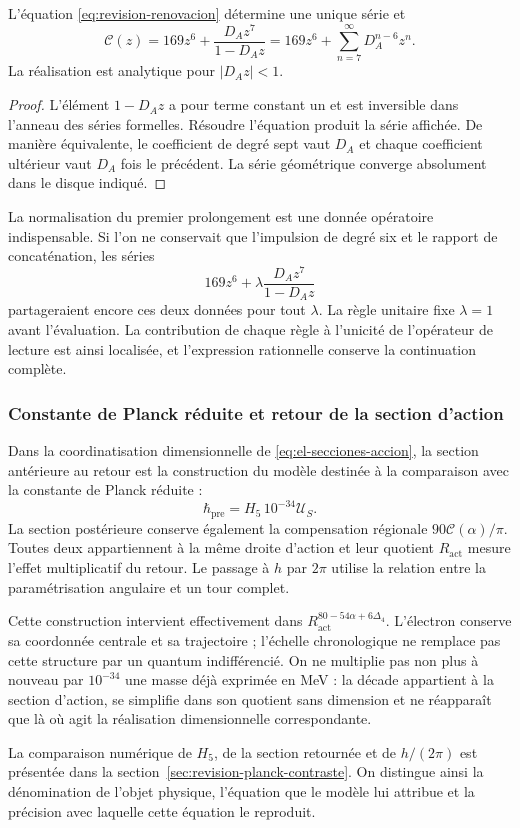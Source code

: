 \begin{proposition}
L'équation \eqref{eq:revision-renovacion} détermine une unique série et
\[
 \mathscr C(z)=169z^6+\frac{D_Az^7}{1-D_Az}
             =169z^6+\sum_{n=7}^{\infty}D_A^{n-6}z^n.
\]
La réalisation est analytique pour \(|D_Az|<1\).
\end{proposition}
\begin{proof}
L'élément \(1-D_Az\) a pour terme constant un et est inversible
dans l'anneau des séries formelles. Résoudre l'équation produit la série
affichée. De manière équivalente, le coefficient de degré sept vaut \(D_A\)
et chaque coefficient ultérieur vaut \(D_A\) fois le précédent. La série
géométrique converge absolument dans le disque indiqué.
\end{proof}

La normalisation du premier prolongement est une donnée opératoire
indispensable. Si l'on ne conservait que l'impulsion de degré six et
le rapport de concaténation, les séries
\[
 169z^6+\lambda\frac{D_Az^7}{1-D_Az}
\]
partageraient encore ces deux données pour tout \(\lambda\).
La règle unitaire fixe \(\lambda=1\) avant l'évaluation.
La contribution de chaque règle à l'unicité de l'opérateur de lecture
est ainsi localisée, et l'expression rationnelle conserve la continuation complète.

\subsubsection{Constante de Planck réduite et retour de la section d'action}

Dans la coordinatisation dimensionnelle de \eqref{eq:el-secciones-accion}, la section
antérieure au retour est la construction du modèle destinée à la comparaison
avec la constante de Planck réduite :
\[
 \hbar_{\mathrm{pre}}=H_5\,10^{-34}\mathcal U_S.
\]
La section postérieure conserve également la compensation régionale
\(90\mathscr C(\alpha)/\pi\). Toutes deux appartiennent à la même droite
d'action et leur quotient \(R_{\mathrm{act}}\) mesure l'effet multiplicatif
du retour. Le passage à \(h\) par \(2\pi\) utilise la relation
entre la paramétrisation angulaire et un tour complet.

Cette construction intervient effectivement dans
\(R_{\mathrm{act}}^{80-54\alpha+6\Delta_4}\). L'électron conserve
sa coordonnée centrale et sa trajectoire ; l'échelle chronologique ne
remplace pas cette structure par un quantum indifférencié. On ne
multiplie pas non plus à nouveau par \(10^{-34}\) une masse déjà exprimée en MeV :
la décade appartient à la section d'action, se simplifie dans son quotient
sans dimension et ne réapparaît que là où agit la réalisation
dimensionnelle correspondante.

La comparaison numérique de \(H_5\), de la section retournée et de
\(h/(2\pi)\) est présentée dans la section~\ref{sec:revision-planck-contraste}.
On distingue ainsi la dénomination de l'objet physique, l'équation que le
modèle lui attribue et la précision avec laquelle cette équation le reproduit.
